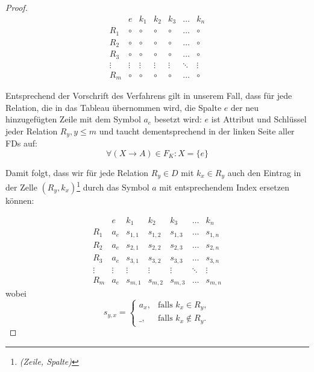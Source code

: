 \begin{proof}
    \[
        \begin{array}{c|cccccc}
            & e      & k_1 & k_2 & k_3 & \dots  & k_n \\
            \hline
            R_{1}      & \circ     & \circ         & \circ         & \circ         & \dots  & \circ         \\
            R_{2}      & \circ     & \circ         & \circ         & \circ         & \dots  & \circ         \\
            R_{3}      & \circ     & \circ         & \circ         & \circ         & \dots  & \circ         \\
            \vdots          & \vdots & \vdots     & \vdots     & \vdots     & \ddots & \vdots     \\
            R_{m}      & \circ     & \circ         & \circ         & \circ         & \dots  & \circ
        \end{array}
    \]
    \medskip

    Entsprechend der Vorschrift des Verfahrens gilt in unserem Fall, dass für jede Relation, die in das Tableau übernommen wird, die Spalte $e$ der neu hinzugefügten Zeile mit dem Symbol $a_e$ besetzt wird: $e$ ist Attribut und Schlüssel jeder Relation $R_{y}, y \leq m$ und taucht dementsprechend in der linken Seite aller FDs auf:
    \[
        \forall (X \rightarrow A) \in F_{K}: X = \{e\}
    \]
    \medskip

    Damit folgt, dass wir für jede Relation $R_{y} \in D$ mit $k_x \in R_y$ auch den Eintrag in der Zelle $(R_{y}, k_x)$\footnote{\textit{(Zeile, Spalte)}} durch das Symbol $a$ mit entsprechendem Index ersetzen können:

    \[
        \begin{array}{c|cccccc}
            & e      & k_1 & k_2 & k_3 & \dots  & k_n \\
            \hline
            R_{1}      & a_e     & s_{1,1}         & s_{1,2}         & s_{1,3}         & \dots  & s_{1,n}         \\
            R_{2}      & a_e     & s_{2,1}         & s_{2,2}         & s_{2,3}         & \dots  & s_{2,n}         \\
            R_{3}      & a_e     & s_{3,1}         & s_{3,2}         & s_{3,3}        & \dots  & s_{3,n}         \\
            \vdots          & \vdots & \vdots     & \vdots     & \vdots     & \ddots & \vdots     \\
            R_{m}      & a_e     & s_{m,1}         & s_{m,2}         & s_{m,3}         & \dots  & s_{m,n}
        \end{array}
    \]
    \noindent
    wobei
    \[
        s_{y,x} =
        \begin{cases}
            a_x, & \text{falls } k_x \in R_y,\\
            \_,  & \text{falls } k_x \notin R_y.
        \end{cases}
    \]


\end{proof}
